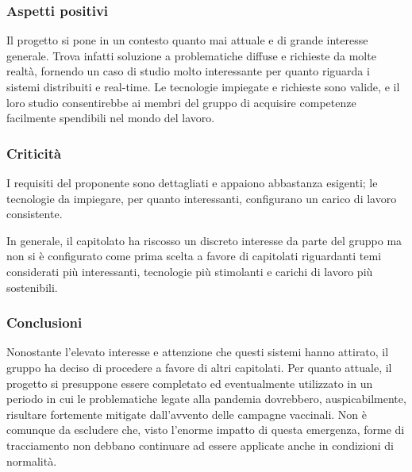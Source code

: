 \subsubsection{Aspetti positivi}

Il progetto si pone in un contesto quanto mai attuale e di grande interesse generale. Trova infatti soluzione a problematiche diffuse e richieste da molte realtà, fornendo un caso di studio molto interessante per quanto riguarda i sistemi distribuiti e real-time. Le tecnologie impiegate e richieste sono valide, e il loro studio consentirebbe ai membri del gruppo di acquisire competenze facilmente spendibili nel mondo del lavoro.



\subsubsection{Criticità}

I requisiti del proponente sono dettagliati e appaiono abbastanza esigenti; le tecnologie da impiegare, per quanto interessanti, configurano un carico di lavoro consistente.

In generale, il capitolato ha riscosso un discreto interesse da parte del gruppo ma non si è configurato come prima scelta a favore di capitolati riguardanti temi considerati più interessanti, tecnologie più stimolanti e carichi di lavoro più sostenibili. 



\subsubsection{Conclusioni}

Nonostante l'elevato interesse e attenzione che questi sistemi hanno attirato, il gruppo ha deciso di procedere a favore di altri capitolati.
Per quanto attuale, il progetto si presuppone essere completato ed eventualmente utilizzato in un periodo in cui le problematiche legate alla pandemia dovrebbero, auspicabilmente, risultare fortemente mitigate dall'avvento delle campagne vaccinali. Non è comunque da escludere che, visto l'enorme impatto di questa emergenza, forme di tracciamento non debbano continuare ad essere applicate anche in condizioni di normalità.




